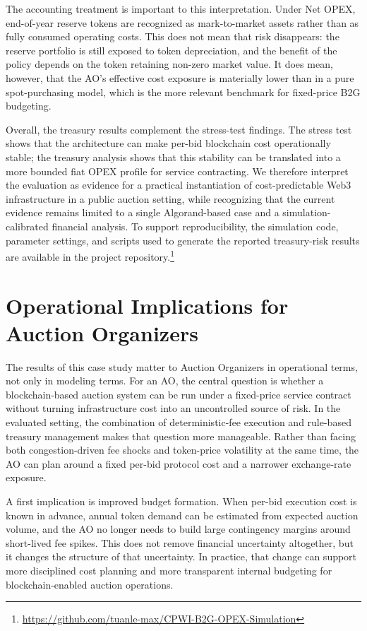 \documentclass[runningheads]{llncs}
\begin{document}
The accounting treatment is important to this interpretation. Under Net OPEX,
end-of-year reserve tokens are recognized as mark-to-market assets rather than
as fully consumed operating costs. This does not mean that risk disappears: the
reserve portfolio is still exposed to token depreciation, and the benefit of the
policy depends on the token retaining non-zero market value. It does mean,
however, that the AO's effective cost exposure is materially lower than in a pure
spot-purchasing model, which is the more relevant benchmark for fixed-price
B2G budgeting.

Overall, the treasury results complement the stress-test findings. The stress test
shows that the architecture can make per-bid blockchain cost operationally
stable; the treasury analysis shows that this stability can be translated into a
more bounded fiat OPEX profile for service contracting. We therefore interpret
the evaluation as evidence for a practical instantiation of cost-predictable
Web3 infrastructure in a public auction setting, while recognizing that the
current evidence remains limited to a single Algorand-based case and a
simulation-calibrated financial analysis. To support reproducibility, the
simulation code, parameter settings, and scripts used to generate the reported
treasury-risk results are available in the project repository.\footnote{\url{https://github.com/tuanle-max/CPWI-B2G-OPEX-Simulation}}


\section{Operational Implications for Auction Organizers}

The results of this case study matter to Auction Organizers in operational terms,
not only in modeling terms. For an AO, the central question is whether a
blockchain-based auction system can be run under a fixed-price service contract
without turning infrastructure cost into an uncontrolled source of risk. In the
evaluated setting, the combination of deterministic-fee execution and rule-based
treasury management makes that question more manageable. Rather than facing
both congestion-driven fee shocks and token-price volatility at the same time,
the AO can plan around a fixed per-bid protocol cost and a narrower exchange-rate
exposure.

A first implication is improved budget formation. When per-bid execution cost is
known in advance, annual token demand can be estimated from expected auction
volume, and the AO no longer needs to build large contingency margins around
short-lived fee spikes. This does not remove financial uncertainty altogether, but
it changes the structure of that uncertainty. In practice, that change can support
more disciplined cost planning and more transparent internal budgeting for
blockchain-enabled auction operations.
\end{document}
